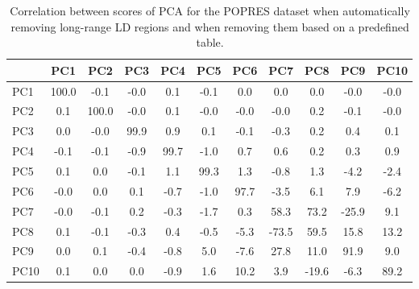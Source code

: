 \documentclass{bioinfo}
\begin{document}
\begin{table}[ht]
\centering
\begin{tabular}{l|cccccccccc}
  \hline
 & PC1 & PC2 & PC3 & PC4 & PC5 & PC6 & PC7 & PC8 & PC9 & PC10 \\
  \hline
PC1 & 100.0 & -0.1 & -0.0 & 0.1 & -0.1 & 0.0 & 0.0 & 0.0 & -0.0 & -0.0 \\
  PC2 & 0.1 & 100.0 & -0.0 & 0.1 & -0.0 & -0.0 & -0.0 & 0.2 & -0.1 & -0.0 \\
  PC3 & 0.0 & -0.0 & 99.9 & 0.9 & 0.1 & -0.1 & -0.3 & 0.2 & 0.4 & 0.1 \\
  PC4 & -0.1 & -0.1 & -0.9 & 99.7 & -1.0 & 0.7 & 0.6 & 0.2 & 0.3 & 0.9 \\
  PC5 & 0.1 & 0.0 & -0.1 & 1.1 & 99.3 & 1.3 & -0.8 & 1.3 & -4.2 & -2.4 \\
  PC6 & -0.0 & 0.0 & 0.1 & -0.7 & -1.0 & 97.7 & -3.5 & 6.1 & 7.9 & -6.2 \\
  PC7 & -0.0 & -0.1 & 0.2 & -0.3 & -1.7 & 0.3 & 58.3 & 73.2 & -25.9 & 9.1 \\
  PC8 & 0.1 & -0.1 & -0.3 & 0.4 & -0.5 & -5.3 & -73.5 & 59.5 & 15.8 & 13.2 \\
  PC9 & 0.0 & 0.1 & -0.4 & -0.8 & 5.0 & -7.6 & 27.8 & 11.0 & 91.9 & 9.0 \\
  PC10 & 0.1 & 0.0 & 0.0 & -0.9 & 1.6 & 10.2 & 3.9 & -19.6 & -6.3 & 89.2 \\
   \hline
\end{tabular}
\caption{Correlation between scores of PCA for the POPRES dataset  when automatically removing long-range LD regions and when removing them based on a predefined table.}
\label{tab:pc-popres}
\end{table}
\end{document}
